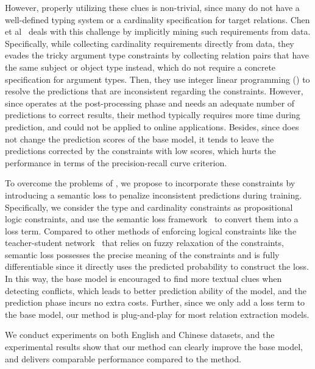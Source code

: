 However, properly utilizing these clues is non-trivial, since many \KBs do not have a well-defined typing system or a cardinality specification for target relations.
Chen et al~ deals with this challenge by implicitly mining such requirements from data.
Specifically, while collecting cardinality requirements directly from data,
they evades the tricky argument type constraints by collecting relation pairs that have the same subject or object type instead, which do not require a concrete specification for argument types.
Then, they use  integer linear programming (\ILP) to resolve the predictions that are inconsistent regarding the constraints.
However, since \ILP operates at the post-processing phase and needs an adequate number of predictions to correct results, their method typically requires more time during prediction, 
and could not be applied to online applications.
Besides, since \ILP does not change the prediction scores of the base model, it tends to leave the predictions corrected by the constraints with low scores, which hurts the performance in terms of the precision-recall curve criterion.

To overcome the problems of \ILP, we propose to incorporate these constraints by introducing a semantic loss to penalize inconsistent predictions during training.
Specifically, we consider the type and cardinality constraints as propositional logic constraints, and use the semantic loss framework~\cite{xu2017semantic} to convert them into a loss term.
Compared to other methods of enforcing logical constraints like the teacher-student network~\cite{hu2016harnessing} that relies on fuzzy relaxation of the constraints, semantic loss possesses the precise meaning of the constraints and is fully differentiable since it directly uses the predicted probability to construct the loss.
In this way, the base model is encouraged to find more textual clues when detecting conflicts, which leads to better prediction ability of the model, and the prediction phase incurs no extra costs.
Further, since we only add a loss term to the base model, our method is plug-and-play for most relation extraction models.

We conduct experiments on both English and Chinese datasets,
and the experimental results show that our method can clearly improve the base model, and delivers comparable performance compared to the \ILP method.


